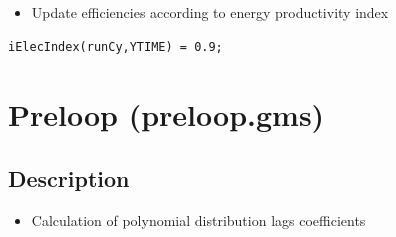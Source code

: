 \documentclass[a4paper,]{scrartcl}
\providecommand{\tightlist}{%
  \setlength{\itemsep}{0pt}\setlength{\parskip}{0pt}}
\begin{document}
\begin{itemize}
\tightlist
\item
  Update efficiencies according to energy productivity index
\end{itemize}

\begin{lstlisting}
iElecIndex(runCy,YTIME) = 0.9;
\end{lstlisting}

\pagebreak

\section{Preloop (preloop.gms)}\label{id-preloop.gms}

\subsection{Description}\label{description-3}

\begin{itemize}
\tightlist
\item
  Calculation of polynomial distribution lags coefficients
\end{itemize}
\end{document}
